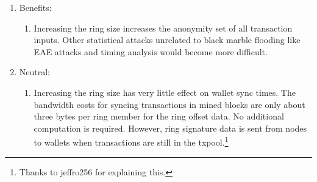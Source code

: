 \documentclass[english]{article}
\begin{document}
\begin{enumerate}
\begin{enumerate}
\begin{enumerate}
\item Verification time per transaction would increase. During normal operation,
the Monero node would use more CPU resources. During initial blockchain
download, total sync time would be greater. Syncing a Monero node
on a HDD, which is already very difficult, might become completely
nonviable because of the necessary random reads for ring signature
verification.
\item At extremes, long verification times can threaten network stability.
In 2023 Pirate Chain suffered a transaction spam attack that caused
chain splits because of long transaction verification times.\footnote{\url{https://web.archive.org/web/20230803171107/https://old.reddit.com/user/SignificantRoof5656/comments/15h9reh/pirate_chains_045_spam_attack_2_months_later/}}
Monero uses the Fluffy Blocks protocol to verify transactions as they
arrive in the txpool instead of bottlenecking verification at the
time new blocks are mined. It is unclear if Pirate Chain, a code fork
of Zcash, uses a compact block protocol.\footnote{See \url{https://github.com/zcash/zips/issues/360}}
As long as the time to verify each block's transactions does not become
a large fraction of mean time between blocks (120 seconds), this is
probably not a threatening issue, \textit{in theory}. In practice,
the Monero node performs many more actions than just verifying the
cryptography of transactions. There may be hidden bottlenecks. Recently,
spikes of transactions with large numbers of inputs have seemed to
cause excess RAM usage of nodes, shutting down nodes in some cases.\footnote{\url{https://github.com/monero-project/monero/issues/9317}}
\end{enumerate}
\item Benefits:
\begin{enumerate}
\item Increasing the ring size increases the anonymity set of all transaction
inputs. Other statistical attacks unrelated to black marble flooding
like EAE attacks and timing analysis would become more difficult.
\end{enumerate}
\item Neutral:
\begin{enumerate}
\item Increasing the ring size has very little effect on wallet sync times.
The bandwidth costs for syncing transactions in mined blocks are only
about three bytes per ring member for the ring offset data. No additional
computation is required. However, ring signature data is sent from
nodes to wallets when transactions are still in the txpool.\footnote{Thanks to jeffro256 for explaining this.}

\end{enumerate}
\end{enumerate}
\end{enumerate}
\end{document}
